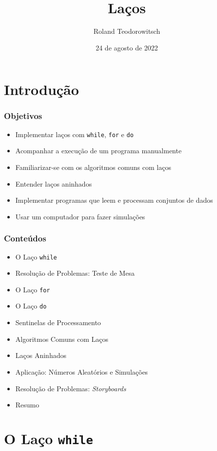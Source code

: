 \documentclass[xcolor={dvipsnames,table},aspectratio=169]{beamer}
\title[\sc{Laços}]{Laços}
\author[Roland Teodorowitsch]{Roland Teodorowitsch}
\institute[FPROG - EP - PUCRS]{Fundamentos de Programação - Escola Politécnica - PUCRS}
\date{24 de agosto de 2022}
\begin{document}
\justifying

\begin{frame}
	\titlepage
\end{frame}

\section{Introdução}

\begin{frame}\frametitle{Objetivos}
\begin{itemize}
	\item Implementar laços com \texttt{while}, \texttt{for} e \texttt{do}
	\item Acompanhar a execução de um programa manualmente
	\item Familiarizar-se com os algoritmos comuns com laços
	\item Entender laços aninhados
	\item Implementar programas que leem e processam conjuntos de dados
	\item Usar um computador para fazer simulações
\end{itemize}
\end{frame}

\begin{frame}\frametitle{Conteúdos}
\begin{itemize}
	\item O Laço \texttt{while}
	\item Resolução de Problemas: Teste de Mesa
	\item O Laço \texttt{for}
	\item O Laço \texttt{do}
	\item Sentinelas de Processamento
	\item Algoritmos Comuns com Laços
	\item Laços Aninhados
	\item Aplicação: Números Aleatórios e Simulações
	\item Resolução de Problemas: \emph{Storyboards}
	\item Resumo
\end{itemize}
\end{frame}

\section{O Laço \texttt{while}}
\end{document}
